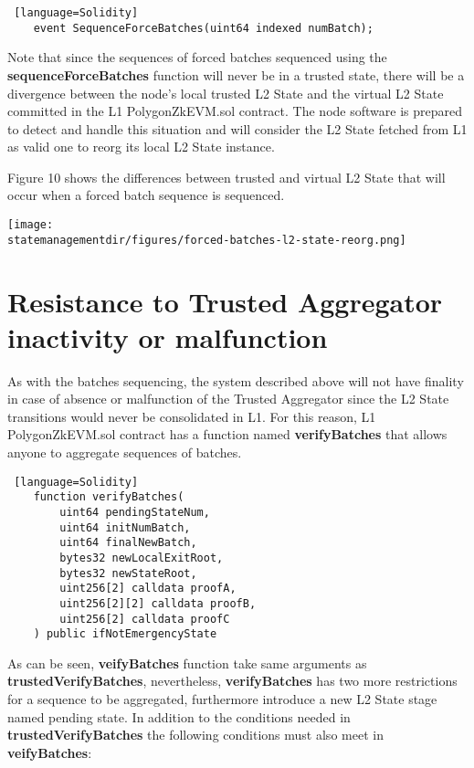 \begin{lstlisting} [language=Solidity]
	event SequenceForceBatches(uint64 indexed numBatch);
\end{lstlisting}

Note that since the sequences of forced batches sequenced using the \textbf{sequenceForceBatches} function will never be in a trusted state, there will be a divergence between the node's local trusted L2 State and the virtual L2 State committed in the L1 PolygonZkEVM.sol contract. The node software is prepared to detect and handle this situation and will consider the L2 State fetched from L1 as valid one to reorg its local L2 State instance.

Figure 10 shows the differences between trusted and virtual L2 State that will occur when a forced batch sequence is sequenced.

\begin{center}
	\texttt{[image: \\statemanagementdir/figures/forced-batches-l2-state-reorg.png]}
	
\end{center}


 
\section{Resistance to Trusted Aggregator inactivity or malfunction}

As with the batches sequencing, the system described above will not have finality in case of absence or malfunction of the Trusted Aggregator since the L2 State transitions would never be consolidated in L1. For this reason, L1 PolygonZkEVM.sol contract has a function named \textbf{verifyBatches} that allows anyone to aggregate sequences of batches.

\begin{lstlisting} [language=Solidity]
	function verifyBatches(
		uint64 pendingStateNum,
		uint64 initNumBatch,
		uint64 finalNewBatch,
		bytes32 newLocalExitRoot,
		bytes32 newStateRoot,
		uint256[2] calldata proofA,
		uint256[2][2] calldata proofB,
		uint256[2] calldata proofC
	) public ifNotEmergencyState
\end{lstlisting}

As can be seen, \textbf{veifyBatches} function take same arguments as \textbf{trustedVerifyBatches}, nevertheless, \textbf{verifyBatches} has two more restrictions for a sequence to be aggregated, furthermore introduce a new L2 State stage named pending state. In addition to the conditions needed in \textbf{trustedVerifyBatches} the following conditions must also meet in \textbf{veifyBatches}:

